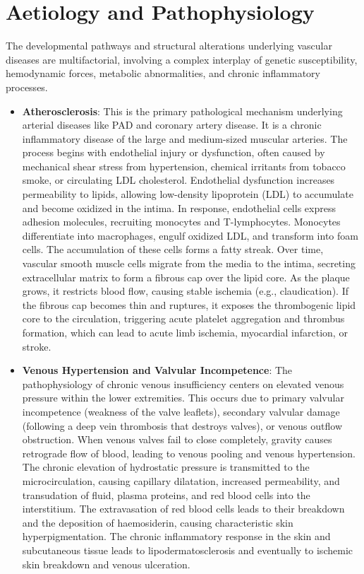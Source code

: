 \section*{Aetiology and Pathophysiology}
The developmental pathways and structural alterations underlying vascular diseases are multifactorial, involving a complex interplay of genetic susceptibility, hemodynamic forces, metabolic abnormalities, and chronic inflammatory processes.

\begin{itemize}
    \item \textbf{Atherosclerosis}: This is the primary pathological mechanism underlying arterial diseases like PAD and coronary artery disease. It is a chronic inflammatory disease of the large and medium-sized muscular arteries. The process begins with endothelial injury or dysfunction, often caused by mechanical shear stress from hypertension, chemical irritants from tobacco smoke, or circulating LDL cholesterol. Endothelial dysfunction increases permeability to lipids, allowing low-density lipoprotein (LDL) to accumulate and become oxidized in the intima. In response, endothelial cells express adhesion molecules, recruiting monocytes and T-lymphocytes. Monocytes differentiate into macrophages, engulf oxidized LDL, and transform into foam cells. The accumulation of these cells forms a fatty streak. Over time, vascular smooth muscle cells migrate from the media to the intima, secreting extracellular matrix to form a fibrous cap over the lipid core. As the plaque grows, it restricts blood flow, causing stable ischemia (e.g., claudication). If the fibrous cap becomes thin and ruptures, it exposes the thrombogenic lipid core to the circulation, triggering acute platelet aggregation and thrombus formation, which can lead to acute limb ischemia, myocardial infarction, or stroke.
    \item \textbf{Venous Hypertension and Valvular Incompetence}: The pathophysiology of chronic venous insufficiency centers on elevated venous pressure within the lower extremities. This occurs due to primary valvular incompetence (weakness of the valve leaflets), secondary valvular damage (following a deep vein thrombosis that destroys valves), or venous outflow obstruction. When venous valves fail to close completely, gravity causes retrograde flow of blood, leading to venous pooling and venous hypertension. The chronic elevation of hydrostatic pressure is transmitted to the microcirculation, causing capillary dilatation, increased permeability, and transudation of fluid, plasma proteins, and red blood cells into the interstitium. The extravasation of red blood cells leads to their breakdown and the deposition of haemosiderin, causing characteristic skin hyperpigmentation. The chronic inflammatory response in the skin and subcutaneous tissue leads to lipodermatosclerosis and eventually to ischemic skin breakdown and venous ulceration.

\end{itemize}
